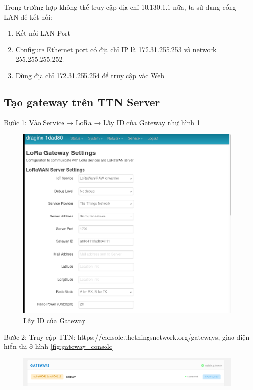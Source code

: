 Trong trường hợp không thể truy cập địa chỉ 10.130.1.1 nữa, ta sử dụng cổng LAN để kết nối:
\begin{enumerate}
    \item Kết nối LAN Port
    \item Configure Ethernet port có địa chỉ IP là 172.31.255.253 và network 255.255.255.252.
    \item Dùng địa chỉ 172.31.255.254 để truy cập vào Web
\end{enumerate}


\subsection{Tạo gateway trên TTN Server}
\begin{description}
    \item Bước 1: Vào Service → LoRa → Lấy ID của Gateway như hình \ref{fig:get_gateway_id}
    \begin{figure}[H]
        \centering
        \includegraphics[width=\textwidth]{images/Quanh/Gateway_ID.png}
        \caption{Lấy ID của Gateway}
        \label{fig:get_gateway_id}
    \end{figure}
    \item Bước 2: Truy cập TTN: https://console.thethingsnetwork.org/gateways, giao diện hiển thị ở hình \ref{fig:gateway_console}
    \begin{figure}[H]
        \centering
        \includegraphics[width=\textwidth]{images/Quanh/Gateway_console.png}

\end{figure}
\end{description}
